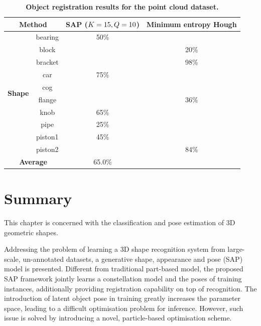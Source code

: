 \begin{table}[ht]
	\centering
	\begin{tabular}{|c|c|c|c|}
		\hline 	
		\multicolumn{2}{|c|}{\textbf{Method}} & SAP ($K = 15, Q = 10$) & Minimum entropy Hough \cite{Woodford2013} \\ \hline \hline 
		\multirow{10}{*}{\textbf{Shape}} & bearing & 50\% & \textbf{\color{blue}{83\%}} \\ \cline{2-4}  
		& block & \textbf{\color{blue}{35\%}} & 20\% \\ \cline{2-4} 
		& bracket & \textbf{\color{blue}{100\%}} & 98\% \\ \cline{2-4}
		& car & 75\% & \textbf{\color{blue}{91\%}} \\ \cline{2-4}
		& cog & \textbf{\color{blue}{100\%}} & \textbf{\color{blue}{100\%}} \\ \cline{2-4}
		& flange & \textbf{\color{blue}{60\%}} & 36\% \\ \cline{2-4}
		& knob & 65\% & \textbf{\color{blue}{91\%}} \\ \cline{2-4}
		& pipe & 25\% & \textbf{\color{blue}{89\%}} \\ \cline{2-4}
		& piston1 & 45\% & \textbf{\color{blue}{54\%}} \\ \cline{2-4}
		& piston2 & \textbf{\color{blue}{95\%}} & 84\% \\ \hline 
		\multicolumn{2}{|c|}{\textbf{Average}} & 65.0\% & \textbf{\color{blue}{74.6\%}} \\ \hline 
	\end{tabular}
	\caption{\textbf{Object registration results for the \textbf{point cloud} dataset.}}
	\label{tab/reg/regresult3d}
\end{table}

\section{Summary}
\label{sec/reg/conclusions}

This chapter is concerned with the classification and pose estimation of 3D geometric shapes. 

Addressing the problem of learning a 3D shape recognition system from large-scale, un-annotated datasets, a generative shape, appearance and pose (SAP) model is presented. Different from traditional part-based model, the proposed SAP framework jointly learns a constellation model and the poses of training instances, additionally providing registration capability on top of recognition. The introduction of latent object pose in training greatly increases the parameter space, leading to a difficult optimisation problem for inference. However, such issue is solved by introducing a novel, particle-based optimisation scheme.  

